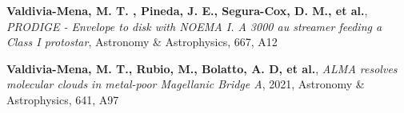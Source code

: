 \vspace{8pt}

\begin{cvitems} %
      \item{\textbf{Valdivia-Mena, M. T. , Pineda, J. E., Segura-Cox, D. M., et al.}, \textit{PRODIGE - Envelope to disk with NOEMA I. A 3000 au streamer feeding a Class I protostar}, Astronomy \& Astrophysics, 667, A12}
      \item{\textbf{Valdivia-Mena, M. T., Rubio, M., Bolatto, A. D, et al.}, \textit{ALMA resolves molecular clouds in metal-poor Magellanic Bridge A}, 2021, Astronomy \& Astrophysics, 641, A97}
\end{cvitems}
\vspace{8pt}
